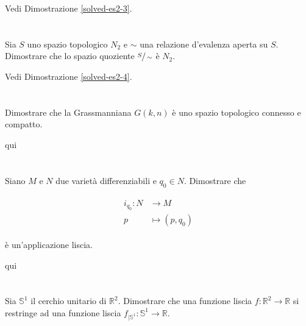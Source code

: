 Vedi Dimostrazione \ref{solved-es2-3}.

\section{}\label{es2-4}

\begin{tcolorbox}
	Sia $ S $ uno spazio topologico $ N_{2} $ e $ \sim $ una relazione d'evalenza aperta su $ S $. Dimostrare che lo spazio quoziente $ \sfrac{S}{\sim} $ è $ N_{2} $.
\end{tcolorbox}

Vedi Dimostrazione \ref{solved-es2-4}.

\section{}\label{es2-5}

\begin{tcolorbox}
	Dimostrare che la Grassmanniana $ G(k,n) $ è uno spazio topologico connesso e compatto.
\end{tcolorbox}

qui

\section{}\label{es2-6}

\begin{tcolorbox}
	Siano $ M $ e $ N $ due varietà differenziabili e $ q_{0} \in N $. Dimostrare che
	
	\begin{align}
		\begin{split}
			i_{q_{0}} : N &\to M\\
			p &\mapsto (p,q_{0})
		\end{split}
	\end{align}
	
	è un'applicazione liscia.
\end{tcolorbox}

qui

\section{}\label{es2-7}

\begin{tcolorbox}
	Sia $ \mathbb{S}^{1} $ il cerchio unitario di $ \mathbb{R}^{2} $. Dimostrare che una funzione liscia $ f : \mathbb{R}^{2} \to \mathbb{R} $ si restringe ad una funzione liscia $ f_{|\mathbb{S}^{1}} : \mathbb{S}^{1} \to \mathbb{R} $.
\end{tcolorbox}

